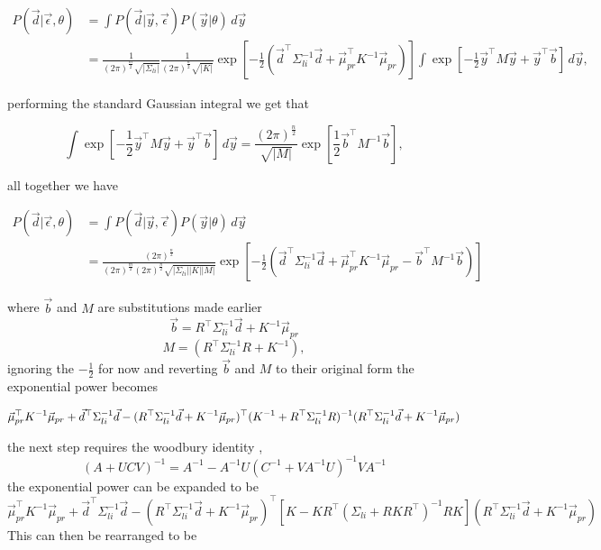 $$
\begin{aligned}
 P(\vec d|\vec\epsilon,\theta) 
 &= \int P(\vec{d}|\vec{y},\vec\epsilon)P(\vec{y}|\theta)  \, d\vec y \\
 &= \frac{1}{(2\pi)^{\frac{m}{2}} \sqrt{|\Sigma_{li}|}} \frac{1}{(2\pi)^{\frac{n}{2}} \sqrt{|K|}} \exp\left[ -\frac{1}{2}(\vec d ^\top \Sigma_{li}^{-1} \vec d + \vec \mu_{pr}^\top K^{-1} \vec \mu_{pr} )\right] \int \exp\left[-\frac{1}{2}\vec y^\top M \vec y + \vec y^\top \vec b\right] \, d\vec y, 
\end{aligned}
$$

performing the standard Gaussian integral we get that

$$
\int \exp\left[-\frac{1}{2}\vec y^\top M \vec y + \vec y^\top \vec b\right] \, d\vec y =  \frac{(2\pi)^\frac{n}{2}}{\sqrt{|M|}} \exp \left[ \frac{1}{2} \vec b^\top M^{-1}\vec b \right],
$$

all together we have

$$
\begin{aligned}
 P(\vec d|\vec\epsilon,\theta) &= \int P(\vec{d}|\vec{y},\vec\epsilon)P(\vec{y}|\theta)  \, d\vec y\\
 &= \frac{(2\pi)^{\frac{n}{2}}}{(2\pi)^{\frac{m}{2}} (2\pi)^{\frac{n}{2}} \sqrt{|\Sigma_{li}||K||M|}} \exp\left[ -\frac{1}{2}(\vec d ^\top \Sigma_{li}^{-1} \vec d + \vec \mu_{pr}^\top K^{-1} \vec \mu_{pr} - \vec b^\top M^{-1}\vec b )\right] 
\end{aligned}
$$

where $\vec b$ and $M$ are substitutions made earlier
$$
\vec b = R^{\top} \Sigma_{li}^{-1}\vec d + K^{-1} \vec \mu_{pr}
$$$$
M = (R^\top \Sigma_{li}^{-1} R + K^{-1}),
$$
ignoring the $-\frac{1}{2}$ for now and reverting $\vec b$ and $M$ to their original form the exponential power becomes

$$
\vec{\mu}_{pr}^{\top} K^{-1} \vec{\mu}_{pr} + \vec{d}^{\top} \Sigma_{li}^{-1} \vec{d}- (R^{\top} \Sigma_{li}^{-1} \vec{d} + K^{-1}\vec{\mu}_{pr})^{\top} (K^{-1} + R^{\top} \Sigma_{li}^{-1} R)^{-1} (R^{\top} \Sigma_{li}^{-1} \vec{d} + K^{-1}\vec{\mu}_{pr})\\
$$

the next step requires the woodbury identity \cite{gp4ml}, 
$$
(A + UCV)^{-1} = A^{-1} - A^{-1}U(C^{-1}+VA^{-1}U)^{-1}VA^{-1}
$$
the exponential power can be expanded to be
$$
\vec{\mu}_{pr}^{\top} K^{-1} \vec{\mu}_{pr} + \vec{d}^{\top} \Sigma_{li}^{-1} \vec{d} - (R^{\top} \Sigma_{li}^{-1} \vec{d} + K^{-1}\vec{\mu}_{pr})^{\top} \left[K - K R^{\top} \left(\Sigma_{li} + RK R^{\top}\right)^{-1} R K \right] (R^{\top} \Sigma_{li}^{-1} \vec{d} + K^{-1}\vec{\mu}_{pr})
$$
This can then be rearranged to be

